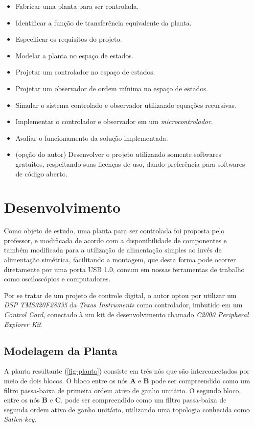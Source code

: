 \documentclass[
	12pt,				%
	article,			%
	openright,			%
	oneside,
	a4paper,			%
	chapter=TITLE,		%
	section=TITLE,		%
	english,			%
	french,				%
	spanish,			%
	brazil,				%
]{abntex2}
\begin{document}
	\begin{itemize}
	    \item Fabricar uma planta para ser controlada.
	    \item Identificar a função de transferência equivalente da planta.
	    \item Especificar os requisitos do projeto.
	    \item Modelar a planta no espaço de estados.
	    \item Projetar um controlador no espaço de estados.
	    \item Projetar um observador de ordem mínima no espaço de estados.
	    \item Simular o sistema controlado e observador utilizando equações recursivas.
	    \item Implementar o controlador e observador em um \textit{microcontrolador}.
	    \item Avaliar o funcionamento da solução implementada.
		\item (opção do autor) Desenvolver o projeto utilizando somente softwares gratuitos, respeitando suas licenças de uso, dando preferência para softwares de código aberto.
	\end{itemize}
	
	\section[Desenvolvimento]{Desenvolvimento}

    	Como objeto de estudo, uma planta para ser controlada foi proposta pelo professor, e modificada de acordo com a disponibilidade de componentes e também modificada para a utilização de alimentação simples ao invés de alimentação simétrica, facilitando a montagem, que desta forma pode ocorrer diretamente por uma porta USB 1.0, comum em nossas ferramentas de trabalho como osciloscópios e computadores.
    	
    	Por se tratar de um projeto de controle digital, o autor optou por utilizar um \textit{DSP} \textit{TMS320F28335} da \textit{Texas Instruments} como controlador, imbutido em um \textit{Control Card}, conectado à um kit de desenvolvimento chamado \textit{C2000 Peripheral Explorer Kit}.
    	
    	\subsection{Modelagem da Planta}
    	
        	A planta resultante (\autoref{fig-planta}) consiste em três nós que são interconectados por meio de dois blocos. O bloco entre os nós \textbf{A} e \textbf{B} pode ser compreendido como um filtro passa-baixa de primeira ordem ativo de ganho unitário. O segundo bloco, entre os nós \textbf{B} e \textbf{C}, pode ser compreendido como um filtro passa-baixa de segunda ordem ativo de ganho unitário, utilizando uma topologia conhecida como \textit{Sallen-key}. 
        	
\end{document}
